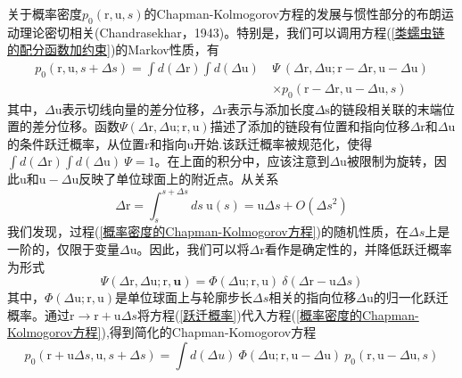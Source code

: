 关于概率密度$p_0(\mathrm{r},\mathrm{u},s)$的Chapman-Kolmogorov方程的发展与惯性部分的布朗运动理论密切相关(Chandrasekhar，1943)。特别是，我们可以调用方程(\ref{类蠕虫链的配分函数加约束})的Markov性质，有\\
\begin{equation}
\begin{aligned}
	p_0(\mathrm{r},\mathrm{u},s+\Delta s)=\int d(\Delta \mathrm{r})\int d(\Delta \mathrm{u})\ &\Psi\  (\Delta \mathrm{r},\Delta \mathrm{u};\mathrm{r}-\Delta \mathrm{r},\mathrm{u}-\Delta \mathrm{u})\\ &\times p_0(\mathrm{r}-\Delta \mathrm{r},\mathrm{u}-\Delta \mathrm{u},s)\label{概率密度的Chapman-Kolmogorov方程}
\end{aligned}
\end{equation}
其中，$\Delta\mathrm{u}$表示切线向量的差分位移，$\Delta \mathrm{r}$表示与添加长度$\Delta \mathrm{s}$的链段相关联的末端位置的差分位移。函数$\Psi(\Delta \mathrm{r},\Delta \mathrm{u};\mathrm{r},\mathrm{u})$描述了添加的链段有位置和指向位移$\Delta \mathrm{r}$和$\Delta \mathrm{u}$的条件跃迁概率，从位置$\mathrm{r}$和指向$\mathrm{u}$开始.该跃迁概率被规范化，使得$\int d(\Delta \mathrm{r})\int d(\Delta \mathrm{u})\ \Psi=1$。在上面的积分中，应该注意到$\Delta\mathrm{u}$被限制为旋转，因此$\mathrm{u}$和$\mathrm{u}-\Delta \mathrm{u}$反映了单位球面上的附近点。从关系\\
\begin{equation}
\Delta \mathrm{r} = \int_{s}^{s+\Delta s}ds\ \mathrm{u}(s)
= \mathrm{u}\Delta s +O(\Delta s ^2)
\end{equation}
我们发现，过程(\ref{概率密度的Chapman-Kolmogorov方程})的随机性质，在$\Delta s$上是一阶的，仅限于变量$\Delta \mathrm{u}$。因此，我们可以将$\Delta \mathrm{r}$看作是确定性的，并降低跃迁概率为形式\\
\begin{equation}
	\Psi(\Delta \mathrm{r} ,\Delta \mathrm{u} ;\mathrm{r}, \mathbf{u})=\Phi(\Delta \mathrm{u};\mathrm{r},\mathrm{u})\ \delta(\Delta \mathrm{r}-\mathrm{u}\Delta s)\label{跃迁概率}
\end{equation}
其中，$\Phi(\Delta \mathrm{u};\mathrm{r},\mathrm{u})$是单位球面上与轮廓步长$\Delta s$相关的指向位移$\Delta \mathrm{u}$的归一化跃迁概率。通过$\mathrm{r}\longrightarrow \mathrm{r}+\mathrm{u}\Delta s$将方程(\ref{跃迁概率})代入方程(\ref{概率密度的Chapman-Kolmogorov方程}),得到简化的Chapman-Komogorov方程\\
\begin{equation}
	p_0(\mathrm{r}+\mathrm{u}\Delta s,\mathrm{u},s+\Delta s)=\int d (\Delta u)\ \Phi(\Delta \mathrm{u} ;\mathrm{r},\mathrm{u}-\Delta \mathrm{u})\ p_0(\mathrm{r},\mathrm{u}-\Delta \mathrm{u},s)\label{简化的Chapman-Komogorov方程}
\end{equation}

